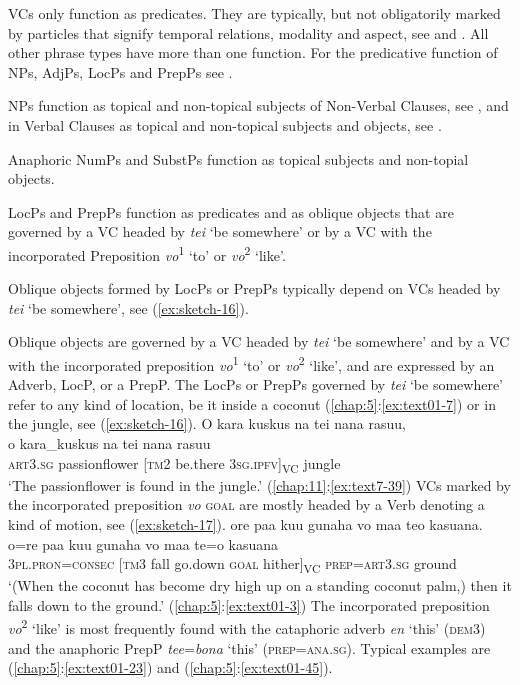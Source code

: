 \documentclass[output=paper]{langscibook}
\begin{document}
VCs only function as predicates. They are typically, but not obligatorily marked by particles that signify temporal relations, modality  and aspect, see  and . All other phrase types have more than one function. For the predicative function of NPs, AdjPs, LocPs and PrepPs see .

NPs function as topical and non-topical subjects of Non-Verbal Clauses, see , and in Verbal Clauses as topical and non-topical subjects and objects, see .

Anaphoric NumPs and SubstPs function as topical subjects and non-topial objects.

LocPs and PrepPs function as predicates and as oblique objects that are governed by a VC headed by \textit{tei} `be somewhere' or by a VC with the incorporated Preposition \textit{vo}\textsuperscript{1} `to' or \textit{vo}\textsuperscript{2} `like'.

Oblique objects formed by LocPs or PrepPs typically depend on VCs headed by \textit{tei} `be somewhere', see (\ref{ex:sketch-16}).

Oblique objects are governed by a VC headed by \textit{tei} `be somewhere' and by a VC with the incorporated preposition \textit{vo}\textsuperscript{1} `to' or \textit{vo}\textsuperscript{2} `like', and are expressed by an Adverb, LocP, or a PrepP. The LocPs or PrepPs governed by \textit{tei} `be somewhere' refer to any kind of location, be it inside a coconut (\ref{chap:5}:\ref{ex:text01-7}) or in the jungle, see (\ref{ex:sketch-16}).
\ea\label{ex:sketch-16}
    O kara kuskus na tei nana rasuu,\\
    \gll o	kara\_kuskus	na	tei	nana	rasuu\\
    \textsc{art}3.\textsc{sg}	passionflower	[\textsc{tm}2	be.there	3\textsc{sg}.\textsc{ipfv}]\textsubscript{VC}	jungle\\
    \glt `The passionflower is found in the jungle.' (\ref{chap:11}:\ref{ex:text7-39})
\z
VCs marked by the incorporated preposition \textit{vo} \textsc{goal} are mostly headed by a Verb denoting a kind of motion, see (\ref{ex:sketch-17}).
\ea\label{ex:sketch-17}
    ore paa kuu gunaha vo maa teo kasuana.\\
    \gll o=re	paa	kuu	gunaha	vo	maa	te=o	kasuana\\
    3\textsc{pl}.\textsc{pron}=\textsc{consec}	[\textsc{tm}3	fall	go.down	\textsc{goal}	hither]\textsubscript{VC}	\textsc{prep}=\textsc{art}3.\textsc{sg}	ground\\
    \glt `(When the coconut has become dry high up on a standing coconut palm,) then it falls down to the ground.' (\ref{chap:5}:\ref{ex:text01-3})
\z
The incorporated preposition \textit{vo}\textsuperscript{2} `like' is most frequently found with the cataphoric adverb \textit{en} `this' (\textsc{dem}3) and the anaphoric PrepP \textit{tee}=\textit{bona} `this' (\textsc{prep}={\allowbreak}\textsc{ana}.\textsc{sg}). Typical examples are (\ref{chap:5}:\ref{ex:text01-23}) and (\ref{chap:5}:\ref{ex:text01-45}).
\end{document}
